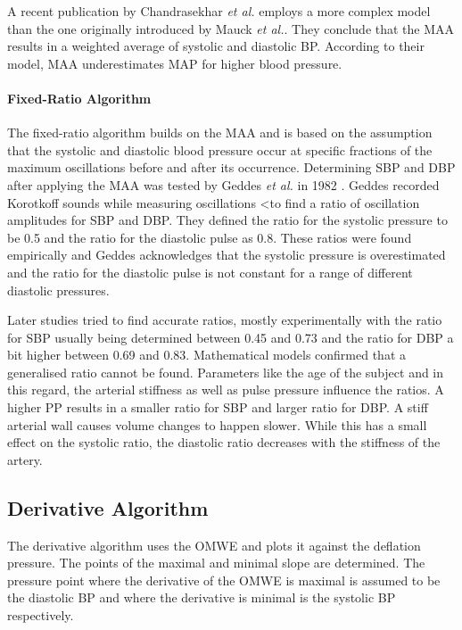 A recent publication by Chandrasekhar \textit{et al.} \cite{Chandrasekhar2019} employs a more complex model than the one originally introduced by Mauck \textit{et al.}\cite{Mauck1980}. They conclude that the MAA results in a weighted average of systolic and diastolic BP. According to their model, MAA underestimates MAP for higher blood pressure.

\paragraph{Fixed-Ratio Algorithm} The fixed-ratio algorithm builds on the MAA and is based on the assumption that the systolic and diastolic blood pressure occur at specific fractions of the maximum oscillations before and after its occurrence. Determining SBP and DBP after applying the MAA was tested by Geddes \textit{et al.} in 1982 \cite{Geddes1982}. Geddes recorded Korotkoff sounds while measuring oscillations <to find a ratio of oscillation amplitudes for SBP and DBP. They defined the ratio for the systolic pressure to be 0.5 and the ratio for the diastolic pulse as 0.8. These ratios were found empirically and Geddes acknowledges that the systolic pressure is overestimated and the ratio for the diastolic pulse is not constant for a range of different diastolic pressures.

Later studies tried to find accurate ratios, mostly experimentally with the ratio for SBP usually being determined between 0.45 and 0.73 and the ratio for DBP a bit higher between 0.69 and 0.83.\cite{Drzewiecki1994,Forouzanfar2015} Mathematical models confirmed that a generalised ratio cannot be found. Parameters like the age of the subject and in this regard, the arterial stiffness as well as pulse pressure influence the ratios. \cite{Ursino1996} A higher PP results in a smaller ratio for SBP and larger ratio for DBP. A stiff arterial wall causes volume changes to happen slower. While this has a small effect on the systolic ratio, the diastolic ratio decreases with the stiffness of the artery.\cite{Babbs2012}



\subsection{Derivative Algorithm}
The derivative algorithm uses the OMWE and plots it against the deflation pressure. The points of the maximal and minimal slope are determined. The pressure point where the derivative of the OMWE is maximal is assumed to be the diastolic BP and where the derivative is minimal is the systolic BP respectively. \cite{Jazbinsek2010,Forouzanfar2015}

